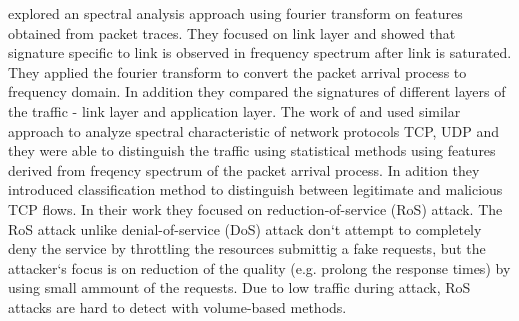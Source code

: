  \cite{he2004spectral} explored an spectral analysis approach using fourier transform on features obtained from packet traces. 
They focused on link layer and showed that signature specific to link
is observed in frequency spectrum after link is saturated. They applied the fourier
transform  to convert the packet arrival process to frequency domain. 
In addition they compared the signatures of different layers of the traffic - link layer 
and application layer.  %
%
The work of  and  \cite{chen2007tcp,chen2007spectral} used similar approach to analyze spectral 
characteristic of network protocols TCP, UDP and they 
were able to distinguish the traffic using statistical methods using features derived
from freqency spectrum of the packet arrival process.
In adition they introduced classification method to distinguish between 
legitimate  and malicious TCP flows. 
In %
their work they focused on reduction-of-service (RoS) attack.
The RoS attack unlike denial-of-service (DoS) attack don`t attempt to completely deny the
service by throttling the resources submittig a fake requests, but the attacker`s focus is on reduction of the quality (e.g. prolong the response times) 
by using small ammount of the requests. 
Due to low traffic during attack, RoS attacks are hard to detect with volume-based methods.
%

